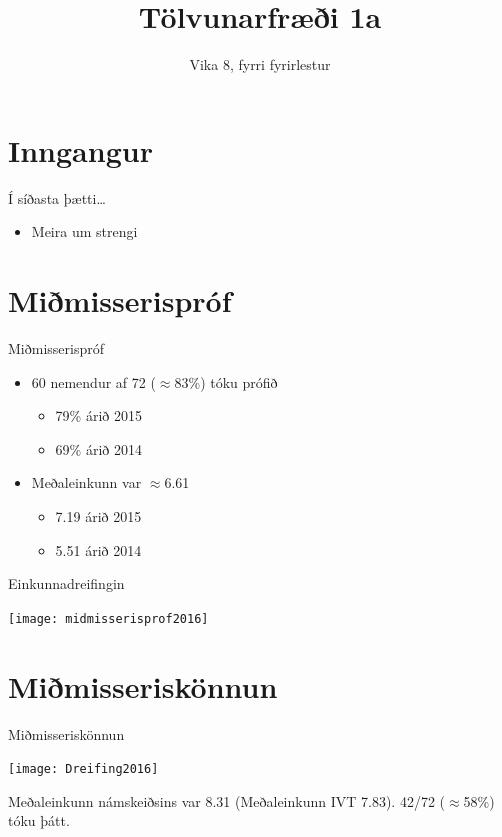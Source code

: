 \documentclass[handout]{beamer}
\title{Tölvunarfræði 1a}
\subtitle{Vika 8, fyrri fyrirlestur}
\begin{document}
\begin{frame}
\titlepage
\end{frame}

\section{Inngangur}

\begin{frame}{Í síðasta þætti\ldots}
\begin{itemize}
 \item Meira um strengi
\end{itemize}
\end{frame}

\section{Miðmisserispróf}

\begin{frame}{Miðmisserispróf}
\pause
\begin{itemize}
 \item 60 nemendur af 72 ($\approx$83\%) tóku prófið 
 \begin{itemize}
  \item 79\% árið 2015
  \item 69\% árið 2014 
 \end{itemize} \pause
 \item Meðaleinkunn var $\approx$6.61 \pause
 \begin{itemize}
  \item 7.19 árið 2015
  \item 5.51 árið 2014
 \end{itemize}
\end{itemize}
\end{frame}

\begin{frame}{Einkunnadreifingin}
\begin{center}
\texttt{[image: midmisserisprof2016]}
\end{center}
\end{frame}


\section{Miðmisseriskönnun}

\begin{frame}{Miðmisseriskönnun}
\begin{center}
\texttt{[image: Dreifing2016]}
\end{center}
Meðaleinkunn námskeiðsins var 8.31 (Meðaleinkunn IVT 7.83). 42/72 ($\approx$58\%) tóku þátt.
\end{frame}
\end{document}
